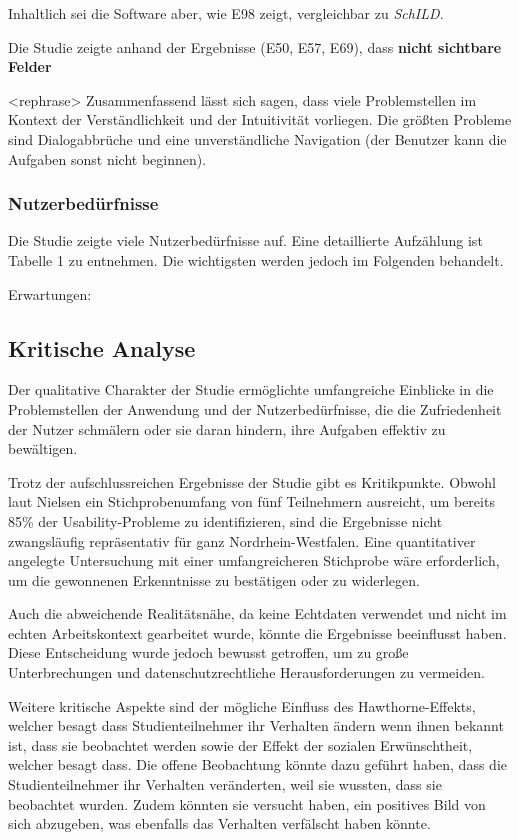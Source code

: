 Inhaltlich sei die Software aber, wie E98 zeigt, vergleichbar zu \textit{SchILD}.

Die Studie zeigte anhand der Ergebnisse (E50, E57, E69), dass \textbf{nicht sichtbare Felder}


<rephrase> Zusammenfassend lässt sich sagen, dass viele Problemstellen im Kontext der Verständlichkeit und der Intuitivität vorliegen. Die größten Probleme sind Dialogabbrüche und eine unverständliche Navigation (der Benutzer kann die Aufgaben sonst nicht beginnen).

\subsubsection{Nutzerbedürfnisse}

Die Studie zeigte viele Nutzerbedürfnisse auf. Eine detaillierte Aufzählung ist Tabelle 1 zu entnehmen. Die wichtigsten werden jedoch im Folgenden behandelt.



Erwartungen:


\subsection{Kritische Analyse}
Der qualitative Charakter der Studie ermöglichte umfangreiche Einblicke in die Problemstellen der Anwendung und der Nutzerbedürfnisse, die die Zufriedenheit der Nutzer schmälern oder sie daran hindern, ihre Aufgaben effektiv zu bewältigen. 

Trotz der aufschlussreichen Ergebnisse der Studie gibt es Kritikpunkte. Obwohl laut Nielsen ein Stichprobenumfang von fünf Teilnehmern ausreicht, um bereits 85\% der Usability-Probleme zu identifizieren\cite{Nielsen5Teilnehmer}, sind die Ergebnisse nicht zwangsläufig repräsentativ für ganz Nordrhein-Westfalen. Eine quantitativer angelegte Untersuchung mit einer umfangreicheren Stichprobe wäre erforderlich, um die gewonnenen Erkenntnisse zu bestätigen oder zu widerlegen.

Auch die abweichende Realitätsnähe, da keine Echtdaten verwendet und nicht im echten Arbeitskontext gearbeitet wurde, könnte die Ergebnisse beeinflusst haben. Diese Entscheidung wurde jedoch bewusst getroffen, um zu große Unterbrechungen und datenschutzrechtliche Herausforderungen zu vermeiden.

Weitere kritische Aspekte sind der mögliche Einfluss des Hawthorne-Effekts, welcher besagt dass Studienteilnehmer ihr Verhalten ändern wenn ihnen bekannt ist, dass sie beobachtet werden sowie der Effekt der sozialen Erwünschtheit, welcher besagt dass. Die offene Beobachtung könnte dazu geführt haben, dass die Studienteilnehmer ihr Verhalten veränderten, weil sie wussten, dass sie beobachtet wurden. Zudem könnten sie versucht haben, ein positives Bild von sich abzugeben, was ebenfalls das Verhalten verfälscht haben könnte.

